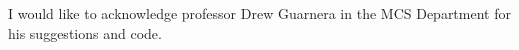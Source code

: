 \documentclass[12pt,code,palatino,picins,blacklinks,kaukecopyright,openright,oneside,final]{woosterthesis} %
\begin{document}
\begin{acknowl}  
I would like to acknowledge professor Drew Guarnera in the MCS Department for his suggestions and code.
\end{acknowl}

%                                                                                       
%                                                                                       


%
%
\end{document}
